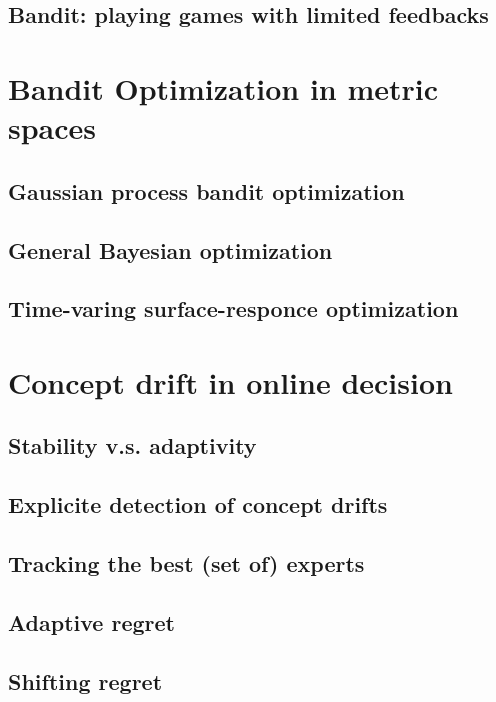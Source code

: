 \documentclass{beamer}
\begin{document}
\subsection{Bandit: playing games with limited feedbacks}


\section{Bandit Optimization in metric spaces}
\subsection{Gaussian process bandit optimization}
\subsection{General Bayesian optimization} 
\subsection{Time-varing surface-responce optimization}



\section{Concept drift in online decision}
\subsection{Stability v.s. adaptivity}
\subsection{Explicite detection of concept drifts}
\subsection{Tracking the best (set of) experts}
\subsection{Adaptive regret}
\subsection{Shifting regret}
\end{document}

